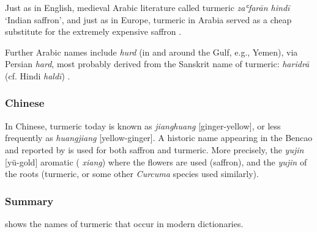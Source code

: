 Just as in English, medieval Arabic literature called turmeric \textit{zaʿfarān hindī} `Indian saffron', and just as in Europe, turmeric in Arabia served as a cheap substitute for the extremely expensive saffron \autocite{amar_arabian_2017}.


Further Arabic names include \textit{hurd} (in and around the Gulf, e.g., Yemen), via Persian \textit{hard}, most probably derived from the Sanskrit name of turmeric:  \textit{haridrā} (cf. Hindi  \textit{haldī}) \autocite{laufer_sino-iranica_1919}.



\subsubsection{Chinese}



In Chinese, turmeric today is known as \textit{jianghuang} [ginger-yellow], or less frequently as \textit{huangjiang} [yellow-ginger]. A historic name appearing in the \gls{Bencao} and reported by \textcite[312-313]{laufer_sino-iranica_1919} is used for both saffron and turmeric. More precisely, the \textit{yujin} [yü-gold] aromatic ( \textit{xiang}) where the flowers are used (saffron), and the \textit{yujin} of the roots (turmeric, or some other \textit{Curcuma} species used similarly).



\subsubsection{Summary}

 shows the names of turmeric that occur in modern dictionaries.




